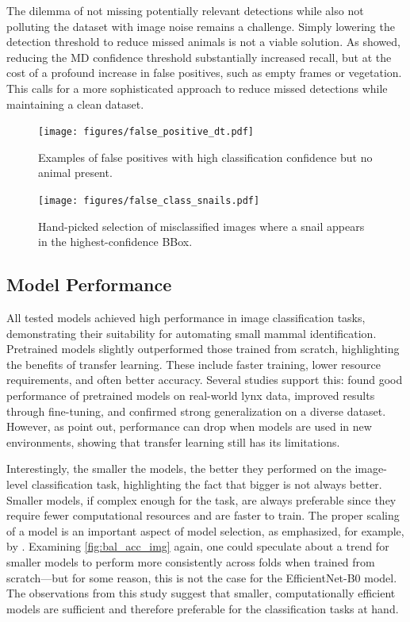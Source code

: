 The dilemma of not missing potentially relevant detections while also not polluting the dataset with image noise remains a challenge.
Simply lowering the detection threshold to reduce missed animals is not a viable solution.
As \textcite{leornaHumanVsMachine2022} showed, reducing the \ac{MD} confidence threshold substantially increased recall, but at the cost of a profound increase in false positives, such as empty frames or vegetation.
This calls for a more sophisticated approach to reduce missed detections while maintaining a clean dataset.

\begin{figure}[ht]
\centering
\texttt{[image: figures/false\_positive\_dt.pdf]}
\caption{Examples of false positives with high classification confidence but no animal present.}
\label{fig:false_positive_dt}
\end{figure}

\begin{figure}[ht]
\centering
\texttt{[image: figures/false\_class\_snails.pdf]}
\caption{Hand-picked selection of misclassified images where a snail appears in the highest-confidence BBox.}
\label{fig:false_class_snails}
\end{figure}

\subsection{Model Performance}
All tested models achieved high performance in image classification tasks, demonstrating their suitability for automating small mammal identification.
Pretrained models slightly outperformed those trained from scratch, highlighting the benefits of transfer learning.
These include faster training, lower resource requirements, and often better accuracy.
Several studies support this: \textcite{stancicClassificationEfficiencyPreTrained2022} found good performance of pretrained models on real-world lynx data, \textcite{doanWildlifeSpeciesClassification2024} improved results through fine-tuning, and \textcite{rameshExploringGeneralizabilityTransfer2025} confirmed strong generalization on a diverse dataset.
However, as \textcite{beeryRecognitionTerraIncognita2018} point out, performance can drop when models are used in new environments, showing that transfer learning still has its limitations.

Interestingly, the smaller the models, the better they performed on the image-level classification task, highlighting the fact that bigger is not always better.
Smaller models, if complex enough for the task, are always preferable since they require fewer computational resources and are faster to train.
The proper scaling of a model is an important aspect of model selection, as emphasized, for example, by \textcite{tanEfficientNetRethinkingModel2019}.
Examining \autoref{fig:bal_acc_img} again, one could speculate about a trend for smaller models to perform more consistently across folds when trained from scratch---but for some reason, this is not the case for the EfficientNet-B0 model.
The observations from this study suggest that smaller, computationally efficient models are sufficient and therefore preferable for the classification tasks at hand.


